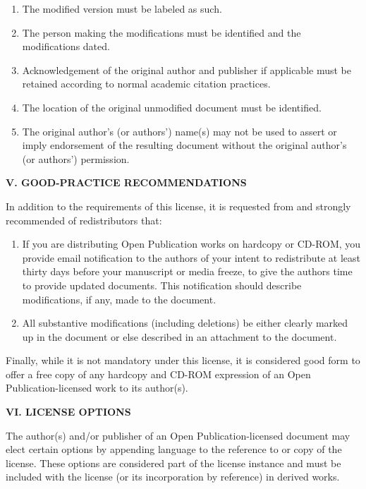 \begin{enumerate}
 \item The modified version must be labeled as such.

 \item The person making the modifications must be identified and the
 modifications dated.

 \item Acknowledgement of the original author and publisher if
 applicable must be retained according to normal academic citation
 practices.

 \item The location of the original unmodified document must be
 identified.

 \item The original author's (or authors') name(s) may not be used to
 assert or imply endorsement of the resulting document without the
 original author's (or authors') permission.
\end{enumerate}

{\bf V. GOOD-PRACTICE RECOMMENDATIONS}

In addition to the requirements of this license, it is requested from
and strongly recommended of redistributors that:

\begin{enumerate} 

 \item If you are distributing Open Publication works on hardcopy or
 CD-ROM, you provide email notification to the authors of your intent to
 redistribute at least thirty days before your manuscript or media
 freeze, to give the authors time to provide updated documents.  This
 notification should describe modifications, if any, made to the
 document.

 \item All substantive modifications (including deletions) be either
 clearly marked up in the document or else described in an attachment to
 the document.
\end{enumerate}

Finally, while it is not mandatory under this license, it is considered
good form to offer a free copy of any hardcopy and CD-ROM expression of
an Open Publication-licensed work to its author(s).

{\bf VI. LICENSE OPTIONS}

The author(s) and/or publisher of an Open Publication-licensed document
may elect certain options by appending language to the reference to or
copy of the license. These options are considered part of the license
instance and must be included with the license (or its incorporation by
reference) in derived works.

